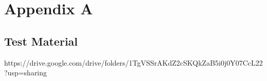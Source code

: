 \chapter{Appendix A}

\section{Test Material}

https://drive.google.com/drive/folders/1TgVSSrAKdZ2cSKQkZaB5i0j0Y07CcL22?usp=sharing